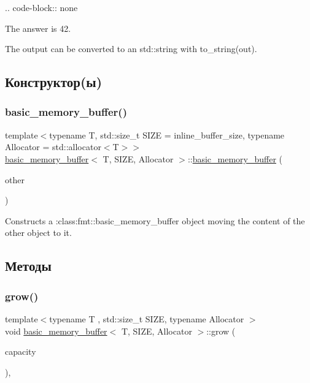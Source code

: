.. code-\/block\+:\+: none

The answer is 42.

The output can be converted to an {\ttfamily std\+::string} with {\ttfamily to\+\_\+string(out)}.  

\subsection{Конструктор(ы)}
\mbox{\label{classbasic__memory__buffer_ae3e8292ba2764ec68bb113cdc6c45b63}} 
\subsubsection{\texorpdfstring{basic\+\_\+memory\+\_\+buffer()}{basic\_memory\_buffer()}}
{\footnotesize\ttfamily template$<$typename T, std\+::size\+\_\+t S\+I\+ZE = inline\+\_\+buffer\+\_\+size, typename Allocator = std\+::allocator$<$\+T$>$$>$ \\
\hyperlink{classbasic__memory__buffer}{basic\+\_\+memory\+\_\+buffer}$<$ T, S\+I\+ZE, Allocator $>$\+::\hyperlink{classbasic__memory__buffer}{basic\+\_\+memory\+\_\+buffer} (\begin{DoxyParamCaption}\item[{\hyperlink{classbasic__memory__buffer}{basic\+\_\+memory\+\_\+buffer}$<$ T, S\+I\+ZE, Allocator $>$ \&\&}]{other }\end{DoxyParamCaption})\hspace{0.3cm}{\ttfamily [inline]}}

Constructs a \+:class\+:{\ttfamily fmt\+::basic\+\_\+memory\+\_\+buffer} object moving the content of the other object to it.  

\subsection{Методы}
\mbox{\label{classbasic__memory__buffer_a2f01489b9805a99cdc93ab0aee6730eb}} 
\subsubsection{\texorpdfstring{grow()}{grow()}}
{\footnotesize\ttfamily template$<$typename T , std\+::size\+\_\+t S\+I\+ZE, typename Allocator $>$ \\
void \hyperlink{classbasic__memory__buffer}{basic\+\_\+memory\+\_\+buffer}$<$ T, S\+I\+ZE, Allocator $>$\+::grow (\begin{DoxyParamCaption}\item[{std\+::size\+\_\+t}]{capacity }\end{DoxyParamCaption})\hspace{0.3cm}{\ttfamily [protected]}, {\ttfamily [virtual]}}

